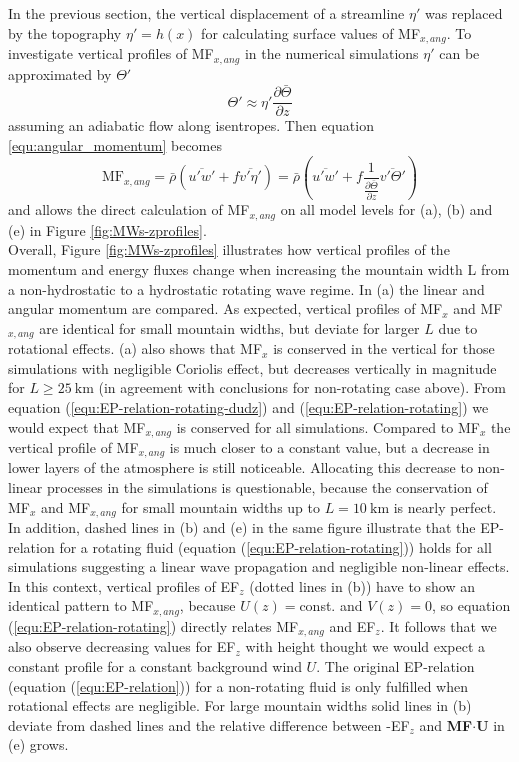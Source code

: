 In the previous section, the vertical displacement of a streamline $\eta'$ was replaced by the topography $\eta'=h(x)$ for calculating surface values of MF$_{x,ang}$. To investigate vertical profiles of MF$_{x,ang}$ in the numerical simulations $\eta'$ can be approximated by $\Theta'$
\begin{equation}
    \Theta' \approx  \eta' \frac{\partial \bar{\Theta}}{\partial z}
    \label{equ:thprime}
\end{equation}
assuming an adiabatic flow along isentropes. Then equation \ref{equ:angular_momentum} becomes
\begin{equation}
    \mathrm{MF}_{x,ang} = \bar{\rho} (\overbar{u'w'} + f \overbar{v' \eta'}) = \bar{\rho} (\overbar{u'w'} + f \frac{1}{\frac{\partial \bar{\Theta}}{\partial z}}\overbar{v' \Theta'})
    \label{equ:angular_momentum_theta}
\end{equation}
and allows the direct calculation of MF$_{x,ang}$ on all model levels for (a), (b) and (e) in Figure \ref{fig:MWs-zprofiles}. \\ 
Overall, Figure \ref{fig:MWs-zprofiles} illustrates how vertical profiles of the momentum and energy fluxes change when increasing the mountain width L from a non-hydrostatic to a hydrostatic rotating wave regime. In (a) the linear and angular momentum are compared. As expected, vertical profiles of MF$_x$ and MF$_{x,ang}$ are identical for small mountain widths, but deviate for larger $L$ due to rotational effects. (a) also shows that MF$_x$ is conserved in the vertical for those simulations with negligible Coriolis effect, but decreases vertically in magnitude for $L \geq \SI{25}{\kilo\meter}$ (in agreement with conclusions for non-rotating case above). From equation (\ref{equ:EP-relation-rotating-dudz}) and (\ref{equ:EP-relation-rotating}) we would expect that MF$_{x,ang}$ is conserved for all simulations. Compared to MF$_x$ the vertical profile of MF$_{x,ang}$ is much closer to a constant value, but a decrease in lower layers of the atmosphere is still noticeable. Allocating this decrease to non-linear processes in the simulations is questionable, because the conservation of MF$_x$ and MF$_{x,ang}$ for small mountain widths up to $L=\SI{10}{\kilo\meter}$ is nearly perfect. In addition, dashed lines in (b) and (e) in the same figure illustrate that the EP-relation for a rotating fluid (equation (\ref{equ:EP-relation-rotating})) holds for all simulations suggesting a linear wave propagation and negligible non-linear effects. In this context, vertical profiles of EF$_z$ (dotted lines in (b)) have to show an identical pattern to MF$_{x,ang}$, because $U(z)=$const. and $V(z)=0$, so equation (\ref{equ:EP-relation-rotating}) directly relates MF$_{x,ang}$ and EF$_z$. It follows that we also observe decreasing values for EF$_z$ with height thought we would expect a constant profile for a constant background wind $U$. The original EP-relation (equation (\ref{equ:EP-relation})) for a non-rotating fluid is only fulfilled when rotational effects are negligible. For large mountain widths solid lines in (b) deviate from dashed lines and the relative difference between -EF$_z$ and \textbf{MF}$\cdot$\textbf{U} in (e) grows. \\
